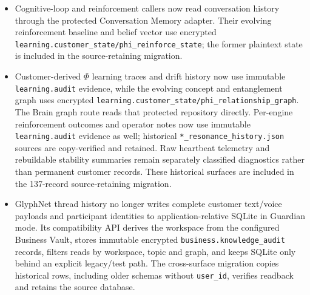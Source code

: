\documentclass[11pt]{article}
\newcommand{\code}[1]{\texttt{#1}}
\begin{document}
\begin{itemize}
  \item Cognitive-loop and reinforcement callers now read conversation history through the protected Conversation Memory adapter. Their evolving reinforcement baseline and belief vector use encrypted \code{learning.customer\_state/phi\_reinforce\_state}; the former plaintext state is included in the source-retaining migration.
  \item Customer-derived $\Phi$ learning traces and drift history now use immutable \code{learning.audit} evidence, while the evolving concept and entanglement graph uses encrypted \code{learning.customer\_state/phi\_relationship\_graph}. The Brain graph route reads that protected repository directly. Per-engine reinforcement outcomes and operator notes now use immutable \code{learning.audit} evidence as well; historical \code{*\_resonance\_history.json} sources are copy-verified and retained. Raw heartbeat telemetry and rebuildable stability summaries remain separately classified diagnostics rather than permanent customer records. These historical surfaces are included in the 137-record source-retaining migration.
  \item GlyphNet thread history no longer writes complete customer text/voice payloads and participant identities to application-relative SQLite in Guardian mode. Its compatibility API derives the workspace from the configured Business Vault, stores immutable encrypted \code{business.knowledge\_audit} records, filters reads by workspace, topic and graph, and keeps SQLite only behind an explicit legacy/test path. The cross-surface migration copies historical rows, including older schemas without \code{user\_id}, verifies readback and retains the source database.

\end{itemize}
\end{document}
